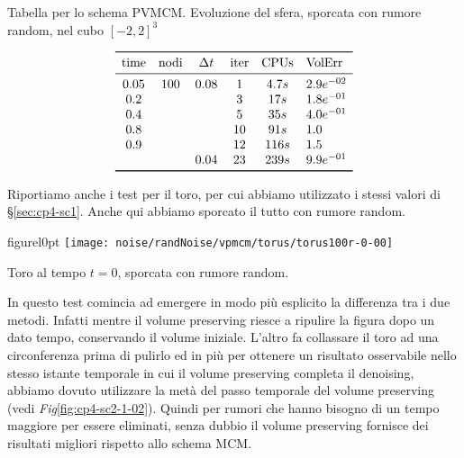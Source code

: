 \begin{table}[htb!]
\caption{Tabella per lo schema PVMCM. Evoluzione del sfera, sporcata
  con rumore random, nel cubo $[-2,2]^3$}
\label{tab:cp4-sc2-1-01}
\[
\begin{array}{*{5}{c}l}
    \toprule
    \text{time} &\text{nodi} &\Delta t &\text{iter} &\text{CPUs}&\text{VolErr} \\
    \midrule
     0.05       & 100        & 0.08    & 1          & 4.7s     &2.9e^{-02}\\
     0.2        &            &         & 3          & 17s      &1.8e^{-01}\\ 
     0.4        &            &         & 5          & 35s      &4.0e^{-01}\\ 
     0.8        &            &         & 10         & 91s      &1.0\\
     0.9        &            &         & 12         & 116s     &1.5\\
                &            & 0.04    & 23         & 239s     &9.9e^{-01}\\  
     \bottomrule
\end{array}
\]
\end{table}
\newpage 
Riportiamo anche i test per il toro, per cui abbiamo utilizzato i
stessi valori di §\ref{sec:cp4-sc1}. Anche qui abbiamo
sporcato il tutto con rumore random.

\begin{wrapfloat}{figure}{l}{0pt}
\texttt{[image: noise/randNoise/vpmcm/torus/torus100r-0-00]}
\caption{Toro al tempo $t=0$, sporcata con rumore random.}
\end{wrapfloat}

In questo test comincia ad emergere in modo più esplicito la
differenza tra i due metodi. Infatti mentre il volume preserving
riesce a ripulire la figura dopo un dato tempo, conservando il volume 
iniziale. L'altro fa collassare il toro ad una circonferenza prima di
pulirlo ed in più per ottenere un risultato osservabile nello stesso
istante temporale in cui il volume preserving completa il denoising,
abbiamo dovuto utilizzare la metà del passo temporale del
volume preserving (vedi \emph{Fig}\ref{fig:cp4-sc2-1-02}). Quindi per
rumori  che hanno  bisogno di un tempo maggiore per essere eliminati,
senza dubbio il volume preserving fornisce dei risultati migliori
rispetto allo schema MCM.

